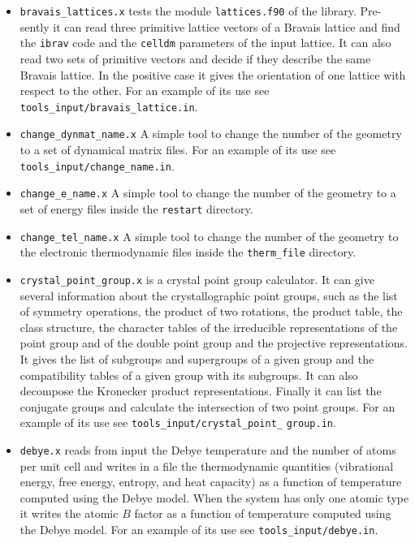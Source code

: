 \documentclass[12pt,a4paper,twoside]{report}
\begin{document}
\begin{itemize}

\item \texttt{bravais\_lattices.x} tests the
module \texttt{lattices.f90} of the library. Pre- sently it can read three
primitive lattice vectors of a Bravais lattice and find the \texttt{ibrav}
code and the \texttt{celldm} parameters of the input lattice. It
can also read two sets of primitive vectors and decide if they describe
the same Bravais lattice. In the positive case it gives the orientation
of one lattice with respect to the other.
For an example of its use see \texttt{tools\_input/bravais\_lattice.in}.

\item \texttt{change\_dynmat\_name.x} A simple tool 
to change the number of the geometry to a set of dynamical matrix files. 
For an example of its use see \texttt{tools\_input/change\_name.in}.

\item \texttt{change\_e\_name.x} A simple tool to change the number of the 
geometry to a set of energy files inside the \texttt{restart} directory. 

\item \texttt{change\_tel\_name.x} A simple tool to change the number of the 
geometry to the electronic thermodynamic files inside the \texttt{therm\_file} 
directory. 

\item \texttt{crystal\_point\_group.x} is a crystal point group calculator.
It can give several information about the crystallographic point groups,
such as the list of symmetry operations, the product of two rotations,
the product table, the class structure, the character tables of 
the irreducible representations of the point group and of the double
point group and the projective representations. It
gives the list of subgroups and supergroups of a given group and 
the compatibility tables of a given group with its subgroups. It can 
also decompose the Kronecker product representations. Finally it
can list the conjugate groups and calculate the intersection of two
point groups.
For an example of its use see \texttt{tools\_input/crystal\_point\_}
\texttt{group.in}.

\item \texttt{debye.x} reads from input the Debye temperature and the
number of atoms per unit cell and writes in a file the thermodynamic
quantities (vibrational energy, free energy, entropy, and heat capacity) as
a function of temperature computed using the Debye model. When the
system has only one atomic type it writes the atomic $B$ factor
as a function of temperature computed using the Debye model.
For an example of its use see \texttt{tools\_input/debye.in}.


\end{itemize}
\end{document}
